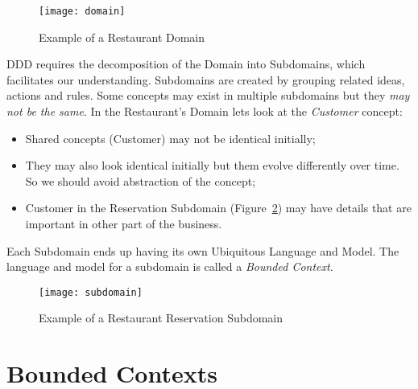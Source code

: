 \begin{figure}[ht]
\caption{Example of a Restaurant Domain}
\centering
\texttt{[image: domain]}
 \label{fig:domain}
\end{figure}

DDD requires the decomposition of the Domain into Subdomains, which facilitates our understanding. Subdomains are created by grouping related ideas, actions and rules. Some concepts may exist in multiple subdomains but they \emph{may not be the same}. In the Restaurant's Domain lets look at the \emph{Customer} concept:
\begin{itemize}
    \item Shared concepts (Customer) may not be identical initially;
    \item They may also look identical initially but them evolve differently over time. So we should avoid abstraction of the concept;
    \item Customer in the Reservation Subdomain (Figure~\ref{fig:subdomain}) may have details that are important in other part of the business.
\end{itemize}

Each Subdomain ends up having its own Ubiquitous Language and Model. The language and model for a subdomain is called a \emph{Bounded Context}.

\begin{figure}[ht]
\caption{Example of a Restaurant Reservation Subdomain}
\centering
\texttt{[image: subdomain]}
 \label{fig:subdomain}
\end{figure}

\section{Bounded Contexts}

